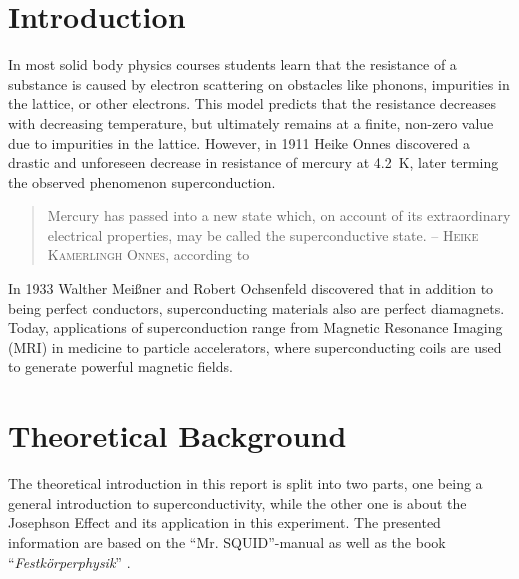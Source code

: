 \documentclass[a4paper,10pt]{article}
\begin{document}
\section{Introduction}
In most solid body physics courses students learn that the resistance of a substance is caused by electron scattering on obstacles like phonons, impurities in the lattice, or other electrons.\cite{grossmarx} This model predicts that the resistance decreases with decreasing temperature, but ultimately remains at a finite, non-zero value due to impurities in the lattice. 
However, in 1911 Heike Onnes discovered a drastic and unforeseen decrease in resistance of mercury at \SI{4.2}{\kelvin}, later terming the observed phenomenon superconduction. 
\begin{quote}
    Mercury has passed into a new state which, on account of its extraordinary electrical properties, may be called the superconductive state. \newline
    -- \textsc{Heike Kamerlingh Onnes}, according to \cite{grossmarx}
\end{quote} 
In 1933 Walther Meißner and Robert Ochsenfeld discovered that in addition to being perfect conductors, superconducting materials also are perfect diamagnets. Today, applications of superconduction range from Magnetic Resonance Imaging (MRI) in medicine to particle accelerators, where superconducting coils are used to generate powerful magnetic fields.\cite{grossmarx}

\section{Theoretical Background}

The theoretical introduction in this report is split into two parts, one being a general introduction to superconductivity, while the other one is about the Josephson Effect and its application in this experiment. The presented information are based on the ``Mr. SQUID''-manual \cite{skriptum} as well as the book ``\textit{Festkörperphysik}'' \cite{grossmarx}.
\end{document}
